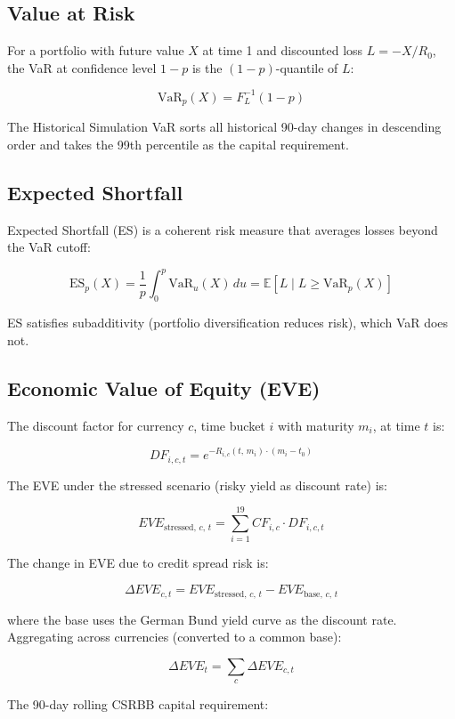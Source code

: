 \documentclass[11pt, a4paper]{article}
\begin{document}
\subsection{Value at Risk}

For a portfolio with future value $X$ at time 1 and discounted loss $L = -X/R_0$, the VaR at confidence level $1-p$ is the $(1-p)$-quantile of $L$:

\[
    \mathrm{VaR}_p(X) = F_L^{-1}(1-p)
\]

The Historical Simulation VaR sorts all historical 90-day changes in descending order and takes the 99th percentile as the capital requirement.

\subsection{Expected Shortfall}

Expected Shortfall (ES) is a coherent risk measure that averages losses beyond the VaR cutoff:

\[
    \mathrm{ES}_p(X) = \frac{1}{p} \int_0^p \mathrm{VaR}_u(X)\, du
    = \mathbb{E}\!\left[L \mid L \geq \mathrm{VaR}_p(X)\right]
\]

ES satisfies subadditivity (portfolio diversification reduces risk), which VaR does not.

\subsection{Economic Value of Equity (EVE)}

The discount factor for currency $c$, time bucket $i$ with maturity $m_i$, at time $t$ is:

\[
    DF_{i,c,t} = e^{-R_{i,c}(t,\, m_i)\cdot(m_i - t_0)}
\]

The EVE under the stressed scenario (risky yield as discount rate) is:

\[
    EVE_{\text{stressed},\, c,\, t} = \sum_{i=1}^{19} CF_{i,c} \cdot DF_{i,c,t}
\]

The change in EVE due to credit spread risk is:

\[
    \Delta EVE_{c,t} = EVE_{\text{stressed},\, c,\, t} - EVE_{\text{base},\, c,\, t}
\]

where the base uses the German Bund yield curve as the discount rate. Aggregating across currencies (converted to a common base):

\[
    \Delta EVE_t = \sum_{c} \Delta EVE_{c,t}
\]

The 90-day rolling CSRBB capital requirement:
\end{document}
